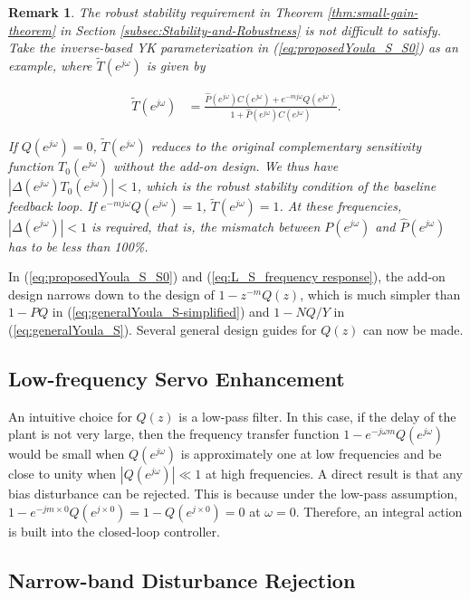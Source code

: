 \documentclass [11pt, proquest] {uwthesis}[2020/02/24]
\newtheorem{remark}{Remark}
\begin{document}
\noindent \begin{remark}The robust stability requirement in Theorem \ref{thm:small-gain-theorem} in Section \ref{subsec:Stability-and-Robustness} is
not difficult to satisfy. Take the inverse-based YK parameterization
in (\ref{eq:proposedYoula_S_S0}) as an example, where $\tilde{T}(e^{j\omega})$
is given by

\begin{align}
\tilde{T}(e^{j\omega}) & =\frac{\hat{P}(e^{j\omega})C(e^{j\omega})+e^{-mj\omega}Q(e^{j\omega})}{1+\hat{P}(e^{j\omega})C(e^{j\omega})}.\label{eq:L_S_frequency response-1}
\end{align}

If $Q(e^{j\omega})=0$, $\tilde{T}(e^{j\omega})$ reduces to the original
complementary sensitivity function $T_{0}(e^{j\omega})$ without the
add-on design. We thus have $\left|\Delta(e^{j\omega})T_{0}(e^{j\omega})\right|<1$,
which is the robust stability condition of the baseline feedback loop.
If $e^{-mj\omega}Q(e^{j\omega})=1$, $\tilde{T}(e^{j\omega})=1$.
At these frequencies, $\left|\Delta(e^{j\omega})\right|<1$ is required,
that is, the mismatch between $P(e^{j\omega})$ and $\hat{P}(e^{j\omega})$
has to be less than 100\%.\end{remark}

In (\ref{eq:proposedYoula_S_S0}) and (\ref{eq:L_S_frequency response}),
the add-on design narrows down to the design of $1-z^{-m}Q(z)$, which
is much simpler than $1-PQ$ in (\ref{eq:generalYoula_S-simplified})
and $1-NQ/Y$ in (\ref{eq:generalYoula_S}). Several general design
guides for $Q(z)$ can now be made.

\subsection{Low-frequency Servo Enhancement}

An intuitive choice for $Q(z)$ is a low-pass filter. In this case,
if the delay of the plant is not very large, then the frequency transfer
function $1-e^{-j\omega m}Q(e^{j\omega})$ would be small when $Q(e^{j\omega})$
is approximately one at low frequencies and be close to unity when
$|Q(e^{j\omega})|\ll1$ at high frequencies. A direct result is that
any bias disturbance can be rejected. This is because under the low-pass
assumption, $1-e^{-jm\times0}Q(e^{j\times0})=1-Q(e^{j\times0})=0$
at $\omega=0$. Therefore, an integral action is built into the closed-loop
controller.

\subsection{Narrow-band Disturbance Rejection}
\end{document}

